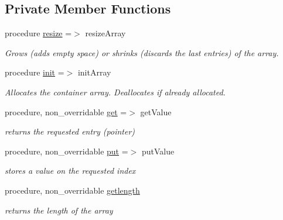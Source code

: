 \subsection*{Private Member Functions}
\begin{DoxyCompactItemize}
\item 
procedure \mbox{\hyperlink{structabstract__container__array__mod_1_1container__array_ac75fccc4c778eb745479dc50f46bf1fe}{resize}} =$>$ resize\+Array
\begin{DoxyCompactList}\small\item\em Grows (adds empty space) or shrinks (discards the last entries) of the array. \end{DoxyCompactList}\item 
procedure \mbox{\hyperlink{structabstract__container__array__mod_1_1container__array_acae485dab14440247585b9dd68d1211e}{init}} =$>$ init\+Array
\begin{DoxyCompactList}\small\item\em Allocates the container array. Deallocates if already allocated. \end{DoxyCompactList}\item 
procedure, non\+\_\+overridable \mbox{\hyperlink{structabstract__container__array__mod_1_1container__array_a9e7ee3cbe7bbcd28749369d010f8eb45}{get}} =$>$ get\+Value
\begin{DoxyCompactList}\small\item\em returns the requested entry (pointer) \end{DoxyCompactList}\item 
procedure, non\+\_\+overridable \mbox{\hyperlink{structabstract__container__array__mod_1_1container__array_a94dad1bae8974dd2a1dfe00059a9608c}{put}} =$>$ put\+Value
\begin{DoxyCompactList}\small\item\em stores a value on the requested index \end{DoxyCompactList}\item 
procedure, non\+\_\+overridable \mbox{\hyperlink{structabstract__container__array__mod_1_1container__array_ab91570b2196a2f5aafb0aa51a114b451}{getlength}}
\begin{DoxyCompactList}\small\item\em returns the length of the array \end{DoxyCompactList}\end{DoxyCompactItemize}
